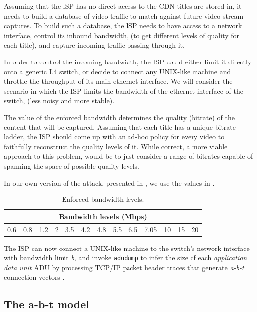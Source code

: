 Assuming that the ISP has no direct access to the CDN titles are stored in, it
needs to build a database of video traffic to match against future video stream
captures. To build such a database, the ISP needs to have access to a network
interface, control its inbound bandwidth, (to get different levels of quality
for each title), and capture incoming traffic passing through it.

In order to control the incoming bandwidth, the ISP could either limit it
directly onto a generic L4 switch, or decide to connect
any UNIX-like machine and throttle the throughput of its main ethernet
interface. We will consider the scenario in which the ISP limits the bandwidth
of the ethernet interface of the switch, (less noisy and more stable).

The value of the enforced bandwidth determines the quality (bitrate) of the
content that will be captured. Assuming that each title has a unique bitrate
ladder, the ISP should come up with an ad-hoc policy for every video to
faithfully reconstruct the quality levels of it. While correct, a more viable
approach to this problem, would be to just consider a range of bitrates capable
of spanning the space of possible quality levels. 

In our own version of the attack, presented in , we use
the values in . 

\begin{table}[htb]
  \centering
  \begin{tabular}{|c|c|c|c|c|c|c|c|c|c|c|c|c|}
    \hline
    \multicolumn{13}{|c|}{\textbf{Bandwidth levels (Mbps)}} \\
    \hline
    0.6 & 0.8 & 1.2 & 2 & 3.5 & 4.2 & 4.8 & 5.5 & 6.5 & 7.05 & 10 & 15 & 20 \\ 
    \hline
  \end{tabular}
  \caption{Enforced bandwidth levels.}
  \label{tab:bandwidths}
\end{table}

The ISP can now connect a UNIX-like machine to the switch's network interface
with bandwidth limit \emph{b}, and invoke \texttt{adudump} to infer the size of
each \emph{application data unit} ADU by processing TCP/IP packet header
traces that generate \emph{a-b-t} connection vectors \cite{hernandez}.

\subsection{The a-b-t model}

